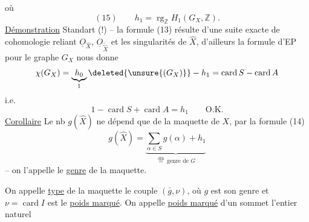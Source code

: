 où 
\[
(15)\qquad h_1=\operatorname{rg}_{\mathbb Z}H_1(G_X,\mathbb Z).
\]
\uline{Démonstration} Standart (!) -- la formule (13) résulte d'une suite exacte  de cohomologie reliant $\underline O_{\widehat X}$, $\underline O_{\widetilde{\widehat X}}$ et les singularités de $\widehat X$, d'ailleurs la formule d'EP pour le graphe $G_X$ nous donne
\[
\chi(G_X)=\underbrace{h_0}_{1}\deleted{\unsure{(G_X)}}-h_1=\operatorname{card}S-\operatorname{card}A
\]
i.e.
\[
1-\operatorname{card}S+\operatorname{card}A=h_1\qquad\text{O.K.}
\]
\uline{Corollaire} Le nb $g(\widehat X)$ ne dépend que de la maquette de $X$, par la formule (14)
\[
g(\widehat X)=\underbrace{\sum_{\alpha\in S}g(\alpha)+h_1}_{\overset{\mathrm{dfn}}{=}\ \text{genre de }G}
\]
-- on l'appelle le \uline{genre} de la maquette.

On appelle \uline{type} de la maquette le couple $(\bar g,\nu)$, où $g$ est son genre et $\nu=\operatorname{card}I$ est le \uline{poids marqué}. On appelle \uline{poids marqué} d'un sommet l'entier naturel
